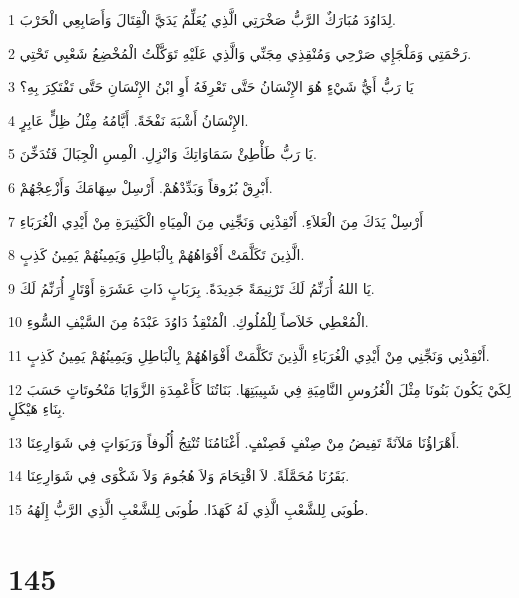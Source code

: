 \par 1 لِدَاوُدَ مُبَارَكٌ الرَّبُّ صَخْرَتِي الَّذِي يُعَلِّمُ يَدَيَّ الْقِتَالَ وَأَصَابِعِي الْحَرْبَ.
\par 2 رَحْمَتِي وَمَلْجَإِي صَرْحِي وَمُنْقِذِي مِجَنِّي وَالَّذِي عَلَيْهِ تَوَكَّلْتُ الْمُخْضِعُ شَعْبِي تَحْتِي.
\par 3 يَا رَبُّ أَيُّ شَيْءٍ هُوَ الإِنْسَانُ حَتَّى تَعْرِفَهُ أَوِ ابْنُ الإِنْسَانِ حَتَّى تَفْتَكِرَ بِهِ؟
\par 4 الإِنْسَانُ أَشْبَهَ نَفْخَةً. أَيَّامُهُ مِثْلُ ظِلٍّ عَابِرٍ.
\par 5 يَا رَبُّ طَأْطِئْ سَمَاوَاتِكَ وَانْزِلِ. الْمِسِ الْجِبَالَ فَتُدَخِّنَ.
\par 6 أَبْرِقْ بُرُوقاً وَبَدِّدْهُمْ. أَرْسِلْ سِهَامَكَ وَأَزْعِجْهُمْ.
\par 7 أَرْسِلْ يَدَكَ مِنَ الْعَلاَءِ. أَنْقِذْنِي وَنَجِّنِي مِنَ الْمِيَاهِ الْكَثِيرَةِ مِنْ أَيْدِي الْغُرَبَاءِ
\par 8 الَّذِينَ تَكَلَّمَتْ أَفْوَاهُهُمْ بِالْبَاطِلِ وَيَمِينُهُمْ يَمِينُ كَذِبٍ.
\par 9 يَا اللهُ أُرَنِّمُ لَكَ تَرْنِيمَةً جَدِيدَةً. بِرَبَابٍ ذَاتِ عَشَرَةِ أَوْتَارٍ أُرَنِّمُ لَكَ.
\par 10 الْمُعْطِي خَلاَصاً لِلْمُلُوكِ. الْمُنْقِذُ دَاوُدَ عَبْدَهُ مِنَ السَّيْفِ السُّوءِ.
\par 11 أَنْقِذْنِي وَنَجِّنِي مِنْ أَيْدِي الْغُرَبَاءِ الَّذِينَ تَكَلَّمَتْ أَفْوَاهُهُمْ بِالْبَاطِلِ وَيَمِينُهُمْ يَمِينُ كَذِبٍ.
\par 12 لِكَيْ يَكُونَ بَنُونَا مِثْلَ الْغُرُوسِ النَّامِيَةِ فِي شَبِيبَتِهَا. بَنَاتُنَا كَأَعْمِدَةِ الزَّوَايَا مَنْحُوتَاتٍ حَسَبَ بِنَاءِ هَيْكَلٍ.
\par 13 أَهْرَاؤُنَا مَلآنَةً تَفِيضُ مِنْ صِنْفٍ فَصِنْفٍ. أَغْنَامُنَا تُنْتِجُ أُلُوفاً وَرَبَوَاتٍ فِي شَوَارِعِنَا.
\par 14 بَقَرُنَا مُحَمَّلَةً. لاَ اقْتِحَامَ وَلاَ هُجُومَ وَلاَ شَكْوَى فِي شَوَارِعِنَا.
\par 15 طُوبَى لِلشَّعْبِ الَّذِي لَهُ كَهَذَا. طُوبَى لِلشَّعْبِ الَّذِي الرَّبُّ إِلَهُهُ.

\chapter{145}

